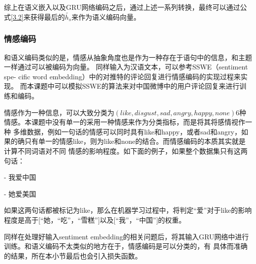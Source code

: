 \documentclass[supercite]{HustGraduPaper}
\theoremstyle{definition}
\begin{document}
综上在语义嵌入以及GRU网络编码之后，通过上述一系列转换，最终可以通过公式\ref{3.2}来获得最后的$\widetilde{h_s}$来作为语义编码向量。

\subsubsection{情感编码}
和语义编码类似的是，情感从抽象角度也是作为一种存在于语句中的信息，和主题一样通过可以被编码为向量。
同样输入为汉语文本，可以参考SSWE\cite{tang-etal-2014-learning}（sentiment spe- cific word embedding）中的对推特的评论回复进行情感编码的实现过程来实现。
而本课题中可以模拟SSWE\cite{tang-etal-2014-learning}的算法来对中国微博中的用户评论回复来进行训练和编码。

情感作为一种信息，可以大致分类为$(like, disgust, sad, angry, happy, none)$6种情感。本课题中没有单一的采用一种情感来作为分类指标，而是将其将感情视作一种
多维数据，例如一句话的情感可以同时具有like和happy，或者sad和angry，如果的确只有单一的情感like，则为like和none的结合。而情感编码的本质其实就是计算不同词语对不同
情感的影响程度。如下面的例子，如果整个数据集只有这两句话：

\begin{shaded*}
    - 我爱中国

    - 她爱美国
\end{shaded*}

如果这两句话都被标记为like，那么在机器学习过程中，将判定“爱”对于like的影响程度是高于[“她，“吃”，“雪糕”]以及[“我”，“中国”]的权重。

同样在处理好输入sentiment embedding的相关问题后，将其输入GRU网络中进行训练。和语义编码不太类似的地方在于，情感编码是可以分类的，有
具体而准确的结果，所在本小节最后也会引入损失函数。
\end{document}
